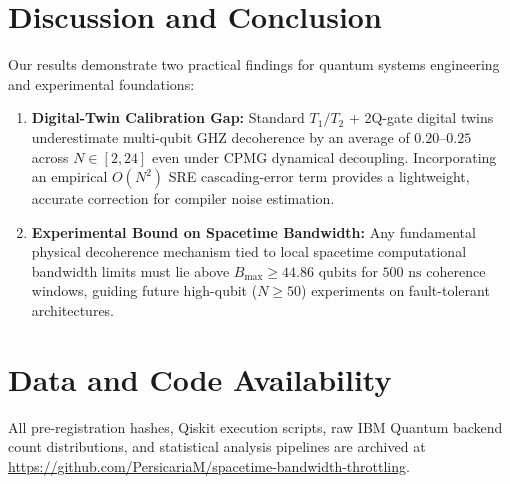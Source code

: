 \documentclass[11pt,a4paper,twocolumn]{article}
\begin{document}
\section{Discussion and Conclusion}
Our results demonstrate two practical findings for quantum systems engineering and experimental foundations:
\begin{enumerate}
    \item \textbf{Digital-Twin Calibration Gap:} Standard $T_1/T_2$ + 2Q-gate digital twins underestimate multi-qubit GHZ decoherence by an average of $0.20$--$0.25$ across $N \in [2, 24]$ even under CPMG dynamical decoupling. Incorporating an empirical $O(N^2)$ SRE cascading-error term provides a lightweight, accurate correction for compiler noise estimation.
    \item \textbf{Experimental Bound on Spacetime Bandwidth:} Any fundamental physical decoherence mechanism tied to local spacetime computational bandwidth limits must lie above $B_{\max} \ge 44.86\text{ qubits}$ for $500\text{ ns}$ coherence windows, guiding future high-qubit ($N \ge 50$) experiments on fault-tolerant architectures.
\end{enumerate}

\section*{Data and Code Availability}
All pre-registration hashes, Qiskit execution scripts, raw IBM Quantum backend count distributions, and statistical analysis pipelines are archived at \url{https://github.com/PersicariaM/spacetime-bandwidth-throttling}.
\end{document}
